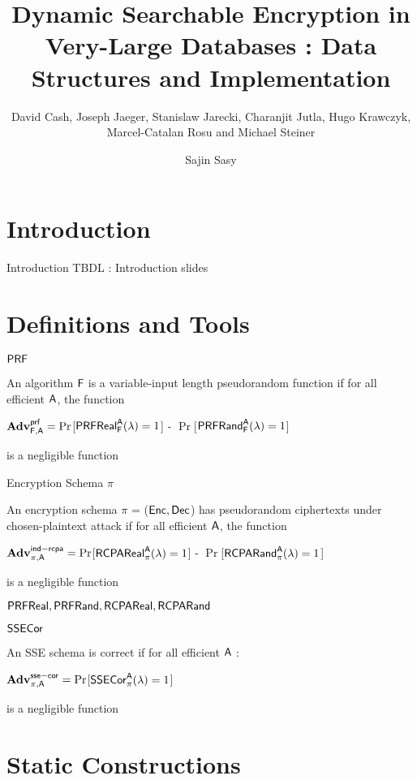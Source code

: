 \documentclass{beamer}
\title{Dynamic Searchable Encryption in Very-Large Databases : Data Structures and Implementation}
\subtitle{David Cash, Joseph Jaeger, Stanislaw Jarecki, Charanjit Jutla, Hugo Krawczyk, Marcel-Catalan Rosu and Michael Steiner}
\author{Sajin Sasy}
\institute{University of Waterloo}
\begin{document}
\maketitle
\section{Introduction}

\begin{frame}{Introduction}
	TBDL : Introduction slides 
\end{frame}

\section{Definitions and Tools}
\begin{frame}{$\mathsf{PRF}$}
\begin{definition}[1] An algorithm $\mathsf{F}$ is a variable-input length pseudorandom function if for all efficient $\mathsf{A}$, the function
\begin{center}
$\textbf{Adv}^{\mathsf{prf}}_{\mathsf{F},\mathsf{A}} = \Pr$[$\mathsf{PRFReal}^{\mathsf{A}}_{\mathsf{F}}(\lambda)=1$] - $\Pr$[$\mathsf{PRFRand}^{\mathsf{A}}_{\mathsf{F}}(\lambda)=1$]
\end{center}
is a negligible function
\end{definition}
\vfill
\end{frame}

\begin{frame}{Encryption Schema $\pi$}
\begin{definition}[2] An encryption schema $\pi$ = ($\mathsf{Enc},\mathsf{Dec}$) has pseudorandom ciphertexts under chosen-plaintext attack if for all efficient $\mathsf{A}$, the function  
\begin{center}
$\textbf{Adv}^{\mathsf{ind-rcpa}}_{\pi,\mathsf{A}} = \Pr$[$\mathsf{RCPAReal}^{\mathsf{A}}_\pi(\lambda)=1$] - $\Pr$[$\mathsf{RCPARand}^{\mathsf{A}}_\pi(\lambda)=1$]
\end{center}
is a negligible function
\end{definition}
\vfill
\end{frame}

\begin{frame}{$\mathsf{PRFReal},\mathsf{PRFRand},\mathsf{RCPAReal},\mathsf{RCPARand}$}

\end{frame}

\begin{frame}{$\mathsf{SSECor}$}
\begin{definition}[3] An SSE schema is correct if for all efficient $\mathsf{A}$ : 
\begin{center}
$\textbf{Adv}^{\mathsf{sse-cor}}_{\pi,\mathsf{A}} = \Pr$[$\mathsf{SSECor}^{\mathsf{A}}_\pi(\lambda)=1$]
\end{center}
is a negligible function
\end{definition}
\vfill
\end{frame}

\section{Static Constructions}

\begin{frame}{}
\end{frame}
\end{document}
